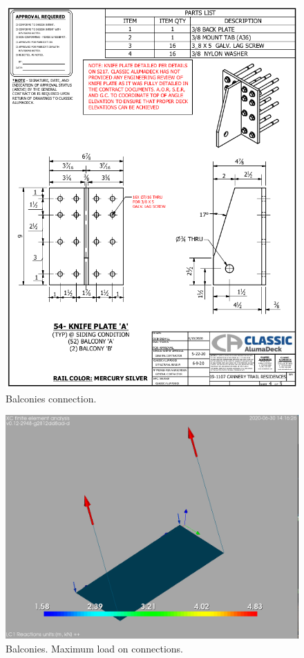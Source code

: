 \begin{figure}
  \begin{center}
    \includegraphics[width=120mm]{figures/balconies_connection}
  \end{center}
  \caption{Balconies connection.} \label{fg_balconies_connection}
\end{figure}

\begin{figure}
  \begin{center}
    \includegraphics[width=120mm]{figures/balcony_reactions}
  \end{center}
  \caption{Balconies. Maximum load on connections.}
\end{figure}

